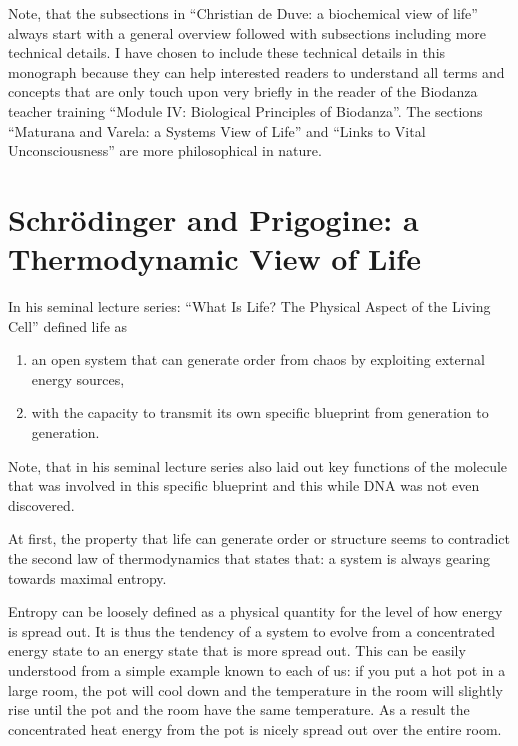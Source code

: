 \documentclass[
  11pt,
]{book}
\begin{document}
Note, that the subsections in ``Christian de Duve: a biochemical view of life'' always start with a general overview followed with subsections including more technical details. I have chosen to include these technical details in this monograph because they can help interested readers to understand all terms and concepts that are only touch upon very briefly in the reader of the Biodanza teacher training ``Module IV: Biological Principles of Biodanza''. The sections ``Maturana and Varela: a Systems View of Life'' and ``Links to Vital Unconsciousness'' are more philosophical in nature.

\hypertarget{schruxf6dinger-and-prigogine-a-thermodynamic-view-of-life}{%
\section{Schrödinger and Prigogine: a Thermodynamic View of Life}\label{schruxf6dinger-and-prigogine-a-thermodynamic-view-of-life}}

In his seminal lecture series: ``What Is Life? The Physical Aspect of the Living Cell'' \citet{schrodinger1944} defined life as

\begin{enumerate}
\def\labelenumi{\arabic{enumi}.}
\item
  an open system that can generate order from chaos by exploiting external energy sources,
\item
  with the capacity to transmit its own specific blueprint from generation to generation.
\end{enumerate}

Note, that in his seminal lecture series \citet{schrodinger1944} also laid out key functions of the molecule that was involved in this specific blueprint and this while DNA was not even discovered.

At first, the property that life can generate order or structure seems to contradict the second law of thermodynamics that states that: a system is always gearing towards maximal entropy.

Entropy can be loosely defined as a physical quantity for the level of how energy is spread out. It is thus the tendency of a system to evolve from a concentrated energy state to an energy state that is more spread out. This can be easily understood from a simple example known to each of us: if you put a hot pot in a large room, the pot will cool down and the temperature in the room will slightly rise until the pot and the room have the same temperature. As a result the concentrated heat energy from the pot is nicely spread out over the entire room.
\end{document}
